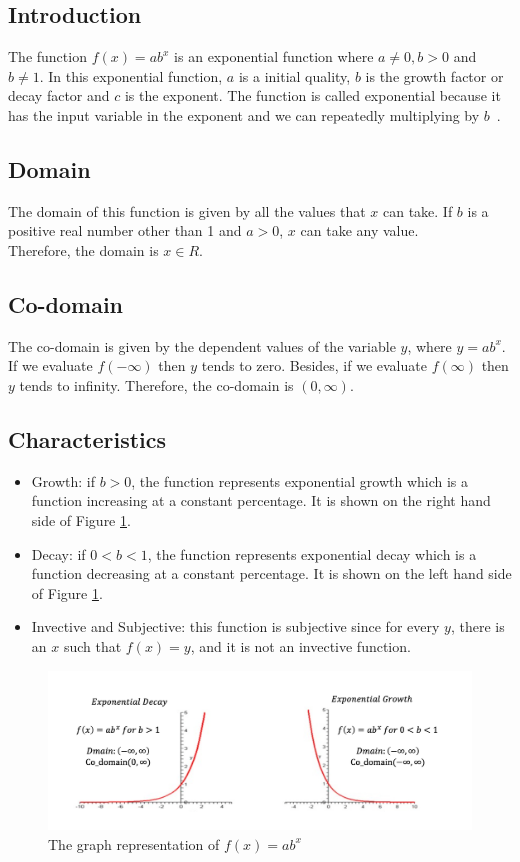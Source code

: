 \documentclass[11pt]{article}
\begin{document}
\subsection{Introduction}
The function $f(x) = ab^x$ is an exponential function where $a\neq0, b>0$ and $b\neq1$. In this exponential function, $a$ is a initial quality, $b$ is the growth factor or decay factor and $c$ is the exponent. The function is called exponential because it has the input variable in the exponent and we can repeatedly multiplying by $b$~\cite{browder2012mathematical}.

\subsection{Domain}
The domain of this function is given by all the values that $x$ can take. If $b$ is a positive real number other than 1 and $a> 0$, $x$ can take any value.\\
Therefore, the domain is \textbf{$x\in R$}.

\subsection{Co-domain}
The co-domain is given by the dependent values of the variable $y$, where $y = ab^x$. If we evaluate $f(-\infty)$ then $y$ tends to zero. Besides, if we evaluate $f(\infty)$ then $y$ tends to infinity.
Therefore, the co-domain is $(0, \infty)$.

\subsection{Characteristics}
\begin{itemize}
    \item Growth: if $b>0$, the function represents exponential growth which is a function increasing at a constant percentage. It is shown on the right hand side of Figure \ref{fig:my_label}.
    \item Decay: if $0<b<1$, the function represents exponential decay which is a function decreasing at a constant percentage. It is shown on the left hand side of Figure \ref{fig:my_label}.
    \item Invective and Subjective: this function is subjective since for every $y$, there is an $x$ such that $f(x) = y$, and it is not an invective function.
\end{itemize}

\begin{figure}[h]
    \centering
    \includegraphics[width=12cm]{images/Function.png}
    \caption{The graph representation of $f(x) = ab^x$}
    \label{fig:my_label}
\end{figure}
\end{document}
